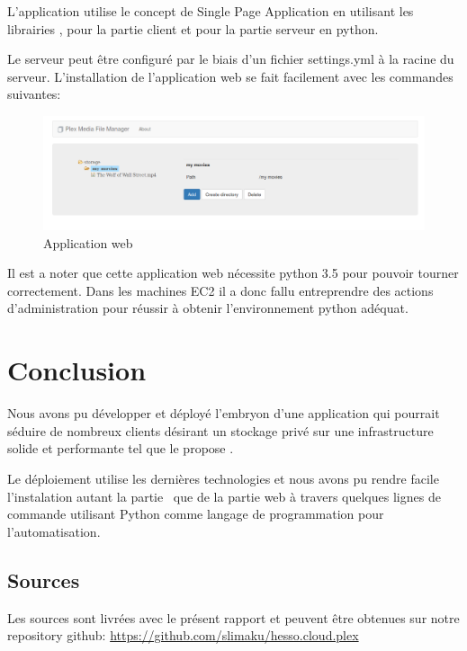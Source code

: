 \documentclass[french]{msereport}
\newcommand{\aws}{\brand{Amazon Web Services}}
\newcommand{\plex}{\brand{PLEX}}
\begin{document}
		L’application utilise le concept de Single Page Application en utilisant les librairies ,  pour la partie client et  pour la partie serveur en python.
		
		Le serveur peut être configuré par le biais d’un fichier settings.yml à la racine du serveur. L’installation de l’application web se fait facilement avec les commandes suivantes:
		
		
		\begin{figure}[h]
			\label{webserver}
			\includegraphics[width=\textwidth]{screen_webserver.png}
			\caption{Application web}
		\end{figure}
	
		Il est a noter que cette application web nécessite python 3.5 pour pouvoir tourner correctement. Dans les machines EC2 il a donc fallu entreprendre des actions d'administration pour réussir à obtenir l'environnement python adéquat.
	
	\section{Conclusion}
		Nous avons pu développer et déployé l'embryon d’une application qui pourrait séduire de nombreux clients désirant un stockage privé sur une infrastructure solide et performante tel que le propose \aws.
		
		Le déploiement utilise les dernières technologies et nous avons pu rendre facile l'instalation autant la partie \plex\ que de la partie web à travers quelques lignes de commande utilisant Python comme langage de programmation pour l’automatisation.
	
	\appendixsection
	
		\listoffigures
		
		\subsection{Sources}
			Les sources sont livrées avec le présent rapport et peuvent être obtenues sur notre repository github: \url{https://github.com/slimaku/hesso.cloud.plex}
	
\end{document}
